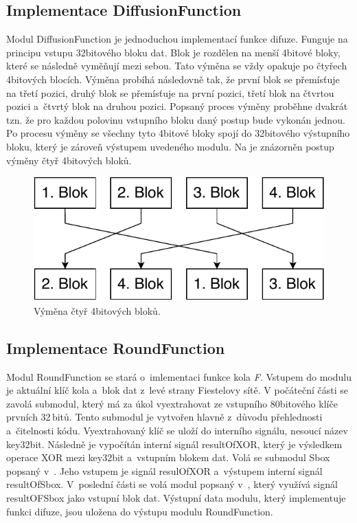 \subsection{Implementace DiffusionFunction\label{subsec:diffusion}}
Modul DiffusionFunction je jednoduchou implementací funkce difuze. Funguje na principu vstupu 32bitového bloku dat. Blok je rozdělen na menší 4bitové bloky, které se následně vyměňují mezi sebou. Tato výměna se vždy opakuje po čtyřech 4bitových blocích. Výměna probíhá následovně tak, že první blok se přemísťuje na třetí pozici, druhý blok se přemísťuje na první pozici, třetí blok na čtvrtou pozici a~čtvrtý blok na druhou pozici. Popsaný proces výměny proběhne dvakrát tzn. že pro každou polovinu vstupního bloku daný postup bude vykonán jednou. Po procesu výměny se všechny tyto 4bitové bloky spojí do 32bitového výstupního bloku, který je zároveň výstupem uvedeného modulu. Na  je znázorněn postup výměny čtyř 4bitových bloků.
\begin{figure}[!h]
  \begin{center}
    \includegraphics[scale=0.6]{obrazky/diffusionBlock.pdf}
  \end{center}
  \caption[Výměna čtyř 4bitových bloků]{Výměna čtyř 4bitových bloků.}
  \label{img:diffusionBlock}
\end{figure}

\subsection{Implementace RoundFunction\label{subsec:round}}
Modul RoundFunction se stará o~imlementaci funkce kola \textit{F}. Vstupem do modulu je aktuální klíč kola a~blok dat z~levé strany Fiestelovy sítě. V počáteční části se zavolá submodul, který má za úkol vyextrahovat ze vstupního 80bitového klíče prvních 32\,bitů. Tento submodul je vytvořen hlavně z~důvodu přehlednosti a~čitelnosti kódu. Vyextrahovaný klíč se uloží do interního signálu, nesoucí název key32bit. Následně je vypočítán interní signál resultOfXOR, který je výsledkem operace XOR mezi key32bit a~vstupním blokem dat. Volá se submodul Sbox popsaný v~. Jeho vstupem je signál resulOfXOR a~výstupem interní signál resultOfSbox. V~poslední části se volá modul popsaný v~, který využívá signál resultOFSbox jako vstupní blok dat. Výstupní data modulu, který implementuje funkci difuze, jsou uložena do výstupu modulu RoundFunction.

